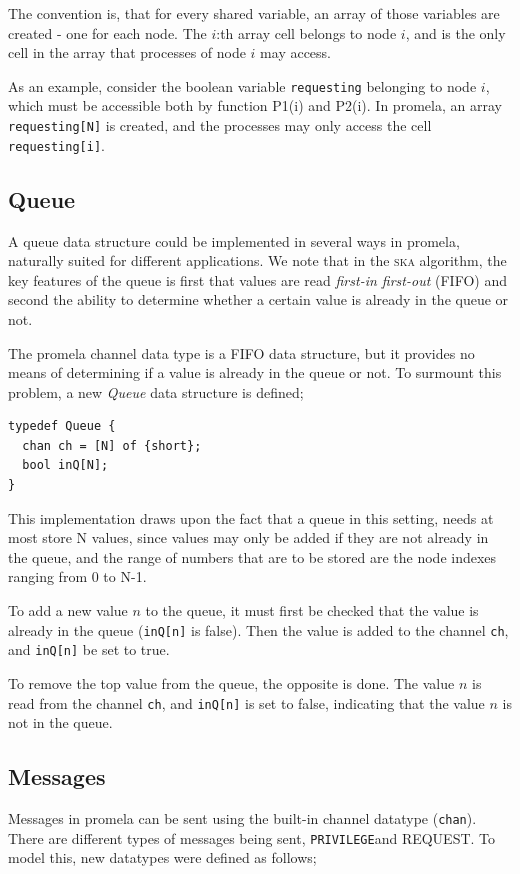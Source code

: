 \documentclass[a4paper,10pt]{llncs}
\begin{document}
The convention is, that for every shared variable, an array of those variables are created - one for each node. The $i$:th array cell belongs to node $i$, and is the only cell in the array that processes of node $i$ may access.

As an example, consider the boolean variable \texttt{requesting} belonging to node $i$, which must be accessible both by function P1(i) and P2(i). In promela, an array \texttt{requesting[N]} is created, and the processes may only access the cell \texttt{requesting[i]}.

\subsection{Queue}
A queue data structure could be implemented in several ways in promela, naturally suited for different applications. We note that in the \textsc{ska} algorithm, the key features of the queue is first that values are read \emph{first-in first-out} (FIFO) and second the ability to determine whether a certain value is already in the queue or not.

The promela channel data type is a FIFO data structure, but it provides no means of determining if a value is already in the queue or not. To surmount this problem, a new \emph{Queue} data structure is defined;

\begin{lstlisting}
typedef Queue {
  chan ch = [N] of {short};
  bool inQ[N];
}
\end{lstlisting}

This implementation draws upon the fact that a queue in this setting, needs at most store N values, since values may only be added if they are not already in the queue, and the range of numbers that are to be stored are the node indexes ranging from 0 to N-1.

To add a new value $n$ to the queue, it must first be checked that the value is already in the queue (\texttt{inQ[n]} is false). Then the value is added to the channel \texttt{ch}, and \texttt{inQ[n]} be set to true.

To remove the top value from the queue, the opposite is done. The value $n$ is read from the channel \texttt{ch}, and \texttt{inQ[n]} is set to false, indicating that the value $n$ is not in the queue.

\subsection{Messages}
Messages in promela can be sent using the built-in channel datatype (\texttt{chan}). There are different types of messages being sent, \texttt{PRIVILEGE}and REQUEST. To model this, new datatypes were defined as follows;
\end{document}
